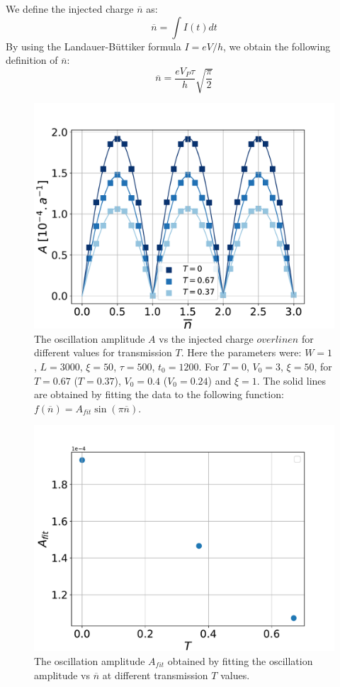 \documentclass[aps,prl,preprint,groupedaddress]{revtex4-1}
\begin{document}
 We define the injected charge $\overline{n}$ as:
 \begin{equation}
 	\overline{n} = \int I(t)dt
 \end{equation}
 By using the Landauer-Büttiker formula $I = eV/h$, we obtain the following definition of $\overline{n}$:
 \begin{equation}
 	\overline{n} = \frac{eV_P\tau}{h}\sqrt{\frac{\pi}{2}}
 \end{equation}
 \begin{figure}
 	\centering
 	\includegraphics[width=0.7\linewidth]{../figures/plot_A_vs_Transm/plot_A_vs_nbar_vs_T}
 	\caption{The oscillation amplitude $A$ vs the injected charge $overline{n}$ for different values for transmission $T$. Here the parameters were: $W =1$, $L = 3000$, $\xi = 50$, $\tau = 500$, $t_0 = 1200$. For $T=0$, $V_0 =3$, $\xi = 50$, for $T=0.67$ ($T=0.37$), $V_0 =0.4$ ($V_0 = 0.24$) and $\xi = 1$. The solid lines are obtained by fitting the data to the following function: $f(\overline{n}) = A_{fit}\sin(\pi \overline{n})$.}
 	\label{fig:avsnbarw1l3000v03lx50ef2}
 \end{figure}
\begin{figure}
	\centering
	\includegraphics[width=0.5\linewidth]{../figures/plot_A_vs_Transm/plot_A_from_fit_vs_Transm}
	\caption{The oscillation amplitude $A_{fit}$ obtained by fitting the oscillation amplitude vs $\overline{n}$ at different transmission $T$ values.}
	\label{fig:plotafromfitvstransm}
\end{figure}
\end{document}
